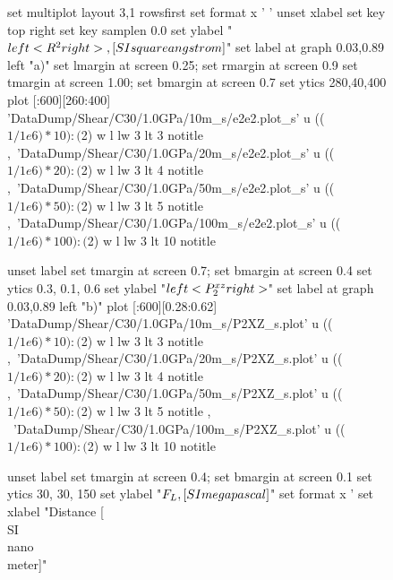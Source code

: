 \documentclass[5p]{elsarticle}
\begin{document}
\begin{figure}[htp]
    	\begin{center}
		\begin{gnuplot}[terminal=epslatex, terminaloptions={size \SERFigwidth cm, \SERFigheight cm color solid}]
			set multiplot layout 3,1 rowsfirst
			set format x ' '
			unset xlabel
			set key top right
			set key samplen  0.0
			set ylabel "$\\left< R^2\\right>  \\,[\\SI{}{\\square\\angstrom}]$"          
			set label at graph 0.03,0.89 left "a)"
			set lmargin at screen 0.25; set rmargin at screen 0.9
			set tmargin at screen 1.00; set bmargin at screen 0.7
			set ytics 280,40,400 
			plot [:600][260:400] 	'DataDump/Shear/C30/1.0GPa/10m_s/e2e2.plot_s'  u  (($1/1e6)*10):($2) w l  lw 3   lt 3  notitle   ,\
								'DataDump/Shear/C30/1.0GPa/20m_s/e2e2.plot_s'  u  (($1/1e6)*20):($2) w l  lw 3   lt 4  notitle   ,\
								'DataDump/Shear/C30/1.0GPa/50m_s/e2e2.plot_s'   u (($1/1e6)*50):($2) w l  lw 3   lt 5  notitle  ,\
								'DataDump/Shear/C30/1.0GPa/100m_s/e2e2.plot_s' u  (($1/1e6)*100):($2) w l  lw 3   lt 10  notitle  
			
			unset label
			set tmargin at screen 0.7; set bmargin at screen 0.4
			set ytics 0.3, 0.1, 0.6			
			set ylabel "$\\left<P_{2}^{xz}\\right>$"        
			set label at graph 0.03,0.89 left "b)"  
			plot  [:600][0.28:0.62]	'DataDump/Shear/C30/1.0GPa/10m_s/P2XZ_s.plot' u   (($1/1e6)*10):($2) w l lw 3 lt 3  notitle   ,\
								'DataDump/Shear/C30/1.0GPa/20m_s/P2XZ_s.plot' u   (($1/1e6)*20):($2) w l  lw 3  lt 4  notitle ,\
								'DataDump/Shear/C30/1.0GPa/50m_s/P2XZ_s.plot' u  (($1/1e6)*50):($2) w l  lw 3   lt 5  notitle , \
								'DataDump/Shear/C30/1.0GPa/100m_s/P2XZ_s.plot' u  (($1/1e6)*100):($2) w l  lw 3  lt 10   notitle

			unset label
			set tmargin at screen 0.4; set bmargin at screen 0.1
			set ytics 30, 30, 150 
			set ylabel "$F_L \\, [\\SI{}{\\mega\\pascal}]$" 
			set format x '%
			set xlabel "Distance [\\SI{}{\\nano\\meter}]"  


\end{gnuplot}
\end{center}
\end{figure}
\end{document}
